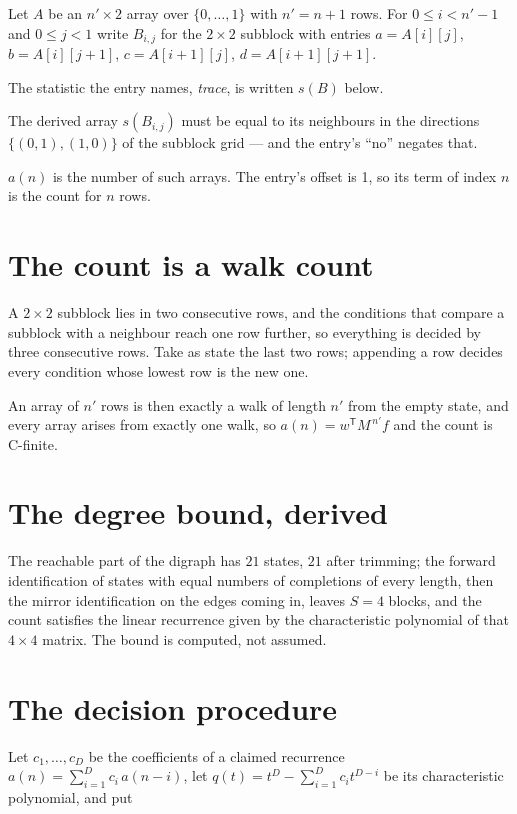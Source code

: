 \documentclass[11pt]{article}
\theoremstyle{definition}
\begin{document}
Let $A$ be an $n' \times 2$ array over $\{0,\dots,1\}$ with $n' = n + 1$ rows. For $0 \le i < n'-1$ and $0 \le j < 1$ write $B_{i,j}$ for the $2\times2$ subblock with entries $a = A[i][j]$, $b = A[i][j{+}1]$, $c = A[i{+}1][j]$, $d = A[i{+}1][j{+}1]$.

The statistic the entry names, {\itshape trace}, is written $s(B)$ below.

The derived array $s(B_{i,j})$ must be equal to its neighbours in the directions $\{(0,1), (1,0)\}$ of the subblock grid --- and the entry's ``no'' negates that.

$a(n)$ is the number of such arrays. The entry's offset is 1, so its term of index $n$ is the count for $n$ rows.

\section{The count is a walk count}

A $2\times2$ subblock lies in two consecutive rows, and the conditions that compare a subblock with a neighbour reach one row further, so everything is decided by three consecutive rows. Take as state the last two rows; appending a row decides every condition whose lowest row is the new one.

An array of $n'$ rows is then exactly a walk of length $n'$ from the empty state, and every array arises from exactly one walk, so $a(n) = w^{\mathsf T}M^{\,n'}f$ and the count is C-finite.

\section{The degree bound, derived}

The reachable part of the digraph has $21$ states, $21$ after trimming; the forward identification of states with equal numbers of completions of every length, then the mirror identification on the edges coming in, leaves $S = 4$ blocks, and the count satisfies the linear recurrence given by the characteristic polynomial of that $4\times4$ matrix. The bound is computed, not assumed.

\section{The decision procedure}

Let $c_1,\dots,c_D$ be the coefficients of a claimed recurrence $a(n) = \sum_{i=1}^{D} c_i\,a(n-i)$, let $q(t) = t^{D} - \sum_{i=1}^{D} c_i t^{D-i}$ be its characteristic polynomial, and put
\end{document}
